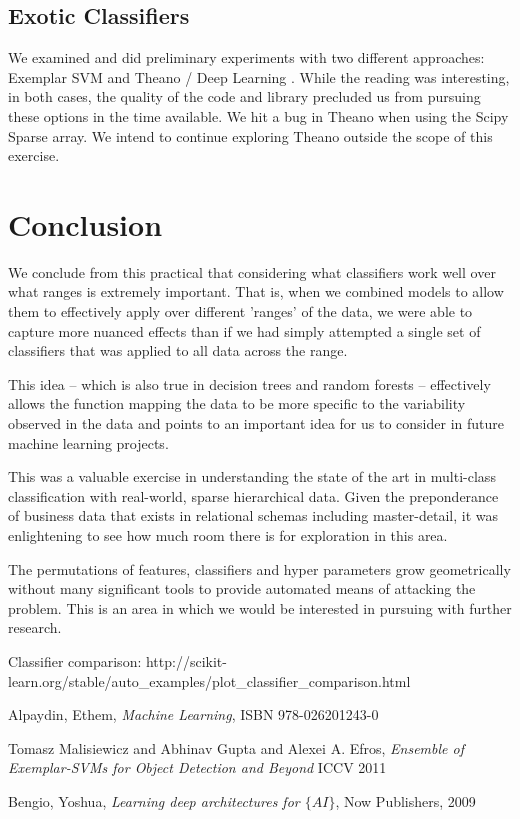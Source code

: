 \documentclass[11pt, oneside]{article}   	%
\begin{document}
\subsection*{Exotic Classifiers}

We examined and did preliminary experiments with two different approaches: Exemplar SVM \cite{exemplar}  and Theano / Deep Learning \cite{deep}. While the reading was interesting, in both cases, the quality of the code and library precluded us from pursuing these options in the time available. We hit a bug in Theano when using the Scipy Sparse array. We intend to continue exploring Theano outside the scope of this exercise.


\section*{Conclusion}

We conclude from this practical that considering what classifiers work well over what ranges is extremely important. That is, when we combined models to allow them to effectively apply over different 'ranges' of the data, we were able to capture more nuanced effects than if we had simply attempted a single set of classifiers that was applied to all data across the range. 

This idea -- which is also true in decision trees and random forests -- effectively allows the function mapping the data to be more specific to the variability observed in the data and points to an important idea for us to consider in future machine learning projects.

This was a valuable exercise in understanding the state of the art in multi-class classification with real-world, sparse hierarchical data. Given the preponderance of business data that exists in relational schemas including master-detail, it was enlightening to see how much room there is for exploration in this area.

The permutations of features, classifiers and hyper parameters grow geometrically without many significant tools to provide automated means of attacking the problem. This is an area in which we would be interested in pursuing with further research.

\begin{thebibliography}{1}

  Classifier comparison:
  http://scikit-learn.org/stable/auto\_examples/plot\_classifier\_comparison.html
  
   Alpaydin, Ethem, \emph{Machine Learning}, ISBN 978-026201243-0

  Tomasz Malisiewicz and Abhinav Gupta and Alexei A. Efros, \emph{Ensemble of Exemplar-SVMs for Object Detection and Beyond} ICCV 2011

  Bengio, Yoshua, \emph{Learning deep architectures for $\{AI\}$}, Now Publishers, 2009

  \end{thebibliography}
\end{document}
